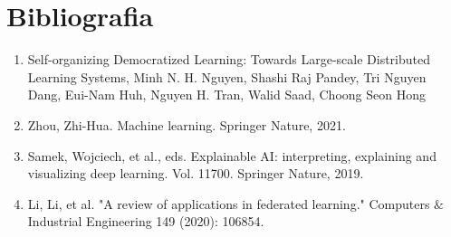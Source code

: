 \chapter{Bibliografia}\label{ch:biblio}
\begin{enumerate}
 \item Self-organizing Democratized Learning: Towards Large-scale Distributed Learning Systems, Minh N. H. Nguyen, Shashi Raj Pandey, Tri Nguyen Dang, Eui-Nam Huh, Nguyen H. Tran, Walid Saad, Choong Seon Hong
 \item Zhou, Zhi-Hua. Machine learning. Springer Nature, 2021.
 \item Samek, Wojciech, et al., eds. Explainable AI: interpreting, explaining and visualizing deep learning. Vol. 11700. Springer Nature, 2019.
 \item Li, Li, et al. "A review of applications in federated learning." Computers $\&$ Industrial Engineering 149 (2020): 106854.
\end{enumerate}